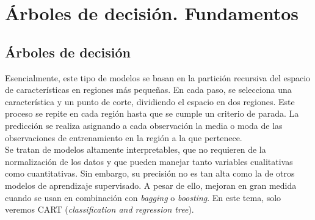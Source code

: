 \chapter{Árboles de decisión. Fundamentos}\label{Chapter6} 

\section{Árboles de decisión}

Esencialmente, este tipo de modelos se basan en la partición recursiva del espacio de características en regiones más pequeñas. En cada paso, se selecciona una característica y un punto de corte, dividiendo el espacio en dos regiones. Este proceso se repite en cada región hasta que se cumple un criterio de parada. La predicción se realiza asignando a cada observación la media o moda de las observaciones de entrenamiento en la región a la que pertenece. \\

Se tratan de modelos altamente interpretables, que no requieren de la normalización de los datos y que pueden manejar tanto variables cualitativas como cuantitativas. Sin embargo, su precisión no es tan alta como la de otros modelos de aprendizaje supervisado. A pesar de ello, mejoran en gran medida cuando se usan en combinación con \textit{bagging} o \textit{boosting}. En este tema, solo veremos CART (\textit{classification and regression tree}). 

